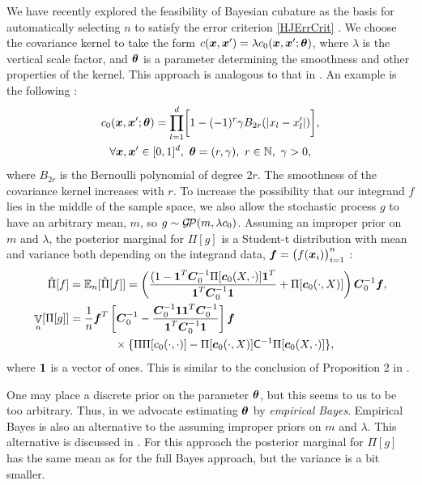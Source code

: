 \documentclass[sts]{imsart}
\numberwithin{equation}{section}
\theoremstyle{plain}
\newcommand{\vC}{\boldsymbol{C}}
\newcommand{\calGP}{\cg\!\cp}
\DeclareMathOperator{\Var}{\mathbb{V}}
\begin{document}
We have recently explored the feasibility of Bayesian cubature as the basis for automatically selecting $n$ to satisfy the error criterion \eqref{HJErrCrit} \cite{RatHic19a}.  We choose the covariance kernel to take the form $c(\boldsymbol{x}, \boldsymbol{x}') =  \lambda c_0(\boldsymbol{x}, \boldsymbol{x}'; \boldsymbol{\theta})$, where $\lambda$ is the vertical scale factor, and $\boldsymbol{\theta}$ is a parameter determining the smoothness and other properties of the kernel.  This approach is analogous to that in \cite[Proposition 2]{BriEtal18a}.  An example is  the following \cite[(36)]{RatHic19a}:
\begin{multline}
\label{the_kernel_eqn_bernoulli}
c_0(\vx, \vx';\vtheta) =
\prod_{l=1}^d \biggl[
1 - (-1)^{r} \gamma B_{2r}( |{x_l-x'_l}| ) \biggr], \\  
\forall \vx,\vx' \in [0,1]^d, \  \vtheta = (r,\gamma), \ r \in \naturals, \ \gamma > 0,
\end{multline}
where $B_{2r}$ is the Bernoulli polynomial of degree $2r$.  The smoothness of the covariance kernel increases with $r$.  To increase the possibility that our integrand $f$ lies in the middle of the sample space, we also allow the stochastic process $g$ to have an arbitrary mean, $m$, so $g \sim \calGP(m, \lambda c_0)$.  Assuming an improper prior on $m$ and $\lambda$, the posterior marginal for $\Pi[g]$ is  a Student-t distribution with mean and variance both depending on the integrand data, $\boldsymbol{f} = \bigl( f(\boldsymbol{x}_i) \bigr)_{i=1}^n$ \cite[(15), (16)]{RatHic19a}:
\begin{align*}
    \hat{\Pi}[f] & =  \Ex_n[\hat{\Pi}[f]] =
\left(
\frac{  (1 - \vone^T  \vC^{-1}_0\Pi[\vc_0(X,\cdot) ] \vone^T }{ \vone^T  \vC^{-1}_0 \vone}   +  \Pi[\vc_0(\cdot, X)]
\right)  \vC^{-1}_0 \vf, \\
\Var_n[\Pi[g]] & = \frac{1}{n}
 \vf^T \left[  \vC^{-1}_0 - 
\frac{  \vC^{-1}_0 \vone \vone^T  \vC^{-1}_0 }{\vone^T  \vC^{-1}_0 \vone}
\right] \vf \\
\label{eqn:errMLE}
&\qquad \qquad \times 
\{\Pi\Pi[c_0(\cdot,\cdot)] - \Pi[\vc_0(\cdot, X)]\mC^{-1} \Pi[\vc_0(X,\cdot)] \},
\end{align*}
where $\boldsymbol{1}$ is a vector of ones.  This is similar to the conclusion of Proposition 2 in \cite{BriEtal18a}.  

One may place a discrete prior on the parameter $\boldsymbol{\theta}$, but this seems to us to be too arbitrary.  Thus, in \cite{RatHic19a} we advocate estimating $\boldsymbol{\theta}$ by \emph{empirical Bayes}.  Empirical Bayes is also an alternative to the assuming improper priors on $m$ and $\lambda$.  This alternative is discussed in \cite{RatHic19a}.  For this approach the posterior marginal for $\Pi[g]$ has the same mean as for the full Bayes approach, but the variance is a bit smaller.  
\end{document}
